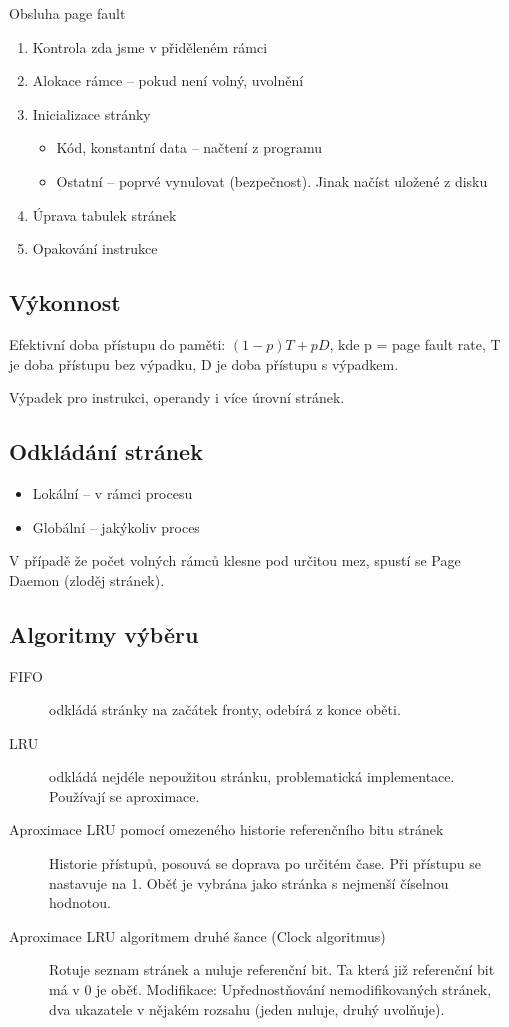 \documentclass[a4wide]{report}
\begin{document}
Obsluha page fault
\begin{enumerate}
	\item Kontrola zda jsme v přiděleném rámci
	\item Alokace rámce -- pokud není volný, uvolnění
	\item Inicializace stránky
	\begin{itemize}
		\item Kód, konstantní data -- načtení z programu
		\item Ostatní -- poprvé vynulovat (bezpečnost). Jinak načíst uložené z disku
	\end{itemize}
	\item Úprava tabulek stránek
	\item Opakování instrukce
\end{enumerate}

\subsection{Výkonnost}

Efektivní doba přístupu do paměti: $(1-p)T + pD$, kde p = page fault rate, T je doba přístupu bez výpadku, D  je doba přístupu s výpadkem.

Výpadek pro instrukci, operandy i více úrovní stránek. 

\subsection{Odkládání stránek}

\begin{itemize}
	\item Lokální -- v rámci procesu
	\item Globální -- jakýkoliv proces
\end{itemize}

V případě že počet volných rámců klesne pod určitou mez, spustí se Page Daemon (zloděj stránek).

\subsection{Algoritmy výběru}

\begin{description}
	\item[FIFO] odkládá stránky na začátek fronty, odebírá z konce oběti.
	\item[LRU] odkládá nejdéle nepoužitou stránku, problematická implementace. Používají se aproximace.
	\item[Aproximace LRU pomocí omezeného historie referenčního bitu stránek] Historie přístupů, posouvá se doprava po určitém čase. Při přístupu se nastavuje na 1. Oběť je vybrána jako stránka s nejmenší číselnou hodnotou.
	\item[Aproximace LRU algoritmem druhé šance (Clock algoritmus)] Rotuje seznam stránek a nuluje referenční bit. Ta která již referenční bit má v 0 je oběť. Modifikace: Upřednostňování nemodifikovaných stránek, dva ukazatele v nějakém rozsahu (jeden nuluje, druhý uvolňuje).
\end{description}
\end{document}
